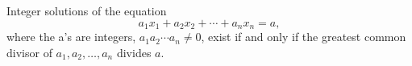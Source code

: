 \begin{proposition}\label{eq:001}
    Integer solutions of the equation 
\[
    a_1 x_1 + a_2x_2 + \cdots + a_n x_n = a,
\]
where the a's are integers, $a_1a_2 \cdots a_n \neq 0$, exist if and only if 
the greatest common divisor of $a_1, a_2, \ldots, a_n$ divides $a$.
\end{proposition}




